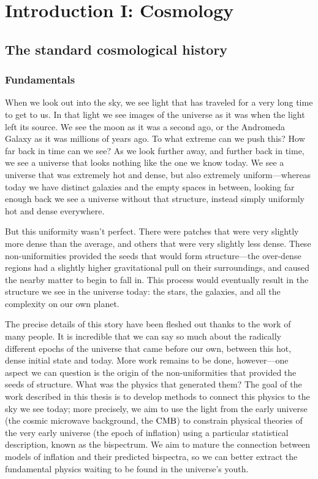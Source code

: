 %
\chapter{Introduction I: Cosmology}\label{chapter:intro_general}
\section{The standard cosmological history}\label{sec:general_intro}
    \subsection{Fundamentals}
When we look out into the sky, we see light that has traveled for a very long time to get to us.
In that light we see images of the universe as it was when the light left its source.
We see the moon as it was a second ago, or the Andromeda Galaxy as it was millions of
years ago. To what extreme can we push this? How far back in time can we see? As we look further
away, and further back in time, we see a universe that looks nothing like the one we know today.
We see a universe that was extremely hot and dense, but also extremely uniform---whereas today
we have distinct galaxies and the empty spaces in between, looking far enough back we see a universe
without that structure, instead simply uniformly hot and dense everywhere.


But this uniformity wasn't perfect. There were patches that were very slightly more dense than the average,
and others that were very slightly less dense. These non-uniformities provided the seeds that would form
structure---the over-dense regions had a slightly higher gravitational pull on their surroundings,
and caused the nearby matter to begin to fall in. This process would eventually result in the structure
we see in the universe today: the stars, the galaxies, and all the complexity on our own planet.


The precise details of this story have been fleshed out thanks to the work of many people.
It is incredible that we can say so much about the radically different epochs of the universe that came before our own,
between this hot, dense initial state and today.
More work remains to be done, however---one aspect we can question is the origin of the non-uniformities
that provided the seeds of structure. What was the physics that generated them?
The goal of the work described in this thesis is to develop methods to connect this physics
to the sky we see today; more precisely, we aim to use the light from the early universe (the cosmic microwave
background, the $\text{CMB}$)
to constrain physical theories of the very early universe (the epoch of inflation) using a particular
statistical description, known as the bispectrum.
We aim to mature the connection between models of inflation and their predicted bispectra, so we can better
extract the fundamental physics waiting to be found in the universe's youth.


